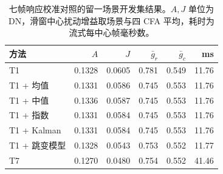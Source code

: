 \begin{table}[!t]
\centering
\caption{七帧响应校准对照的留一场景开发集结果。$A,J$ 单位为 DN，滑窗中心扰动增益取场景与四 CFA 平均，耗时为流式每中心帧毫秒数。}\label{tab:filters}
\footnotesize
\setlength{\tabcolsep}{2.6pt}
\begin{tabular}{lrrrrr}
\toprule
方法 & $A$ & $J$ & $\bar g_r$ & $\bar g_c$ & ms \\
\midrule
T1 & 0.1328 & 0.0605 & 0.781 & 0.549 & 11.76 \\
T1 + 均值 & 0.1331 & 0.0586 & 0.745 & 0.553 & 11.76 \\
T1 + 中值 & 0.1336 & 0.0587 & 0.745 & 0.553 & 11.76 \\
T1 + 指数 & 0.1331 & 0.0584 & 0.745 & 0.553 & 11.76 \\
T1 + Kalman & 0.1331 & 0.0584 & 0.745 & 0.553 & 11.76 \\
T1 + 跳变模型 & 0.1328 & 0.0543 & 0.753 & 0.552 & 11.77 \\
T7 & 0.1270 & 0.0480 & 0.754 & 0.552 & 41.46 \\
\bottomrule
\end{tabular}
\end{table}

